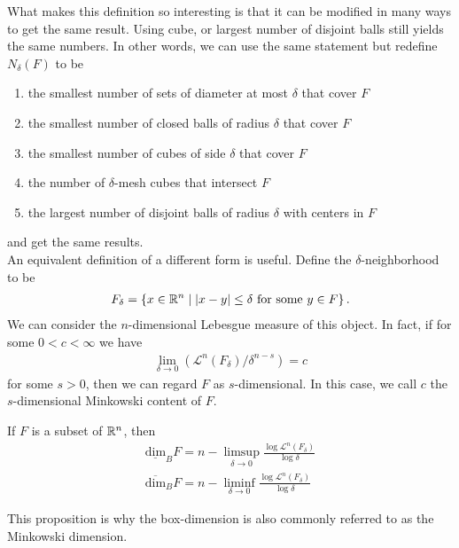 \documentclass{memoir}
\begin{document}
What makes this definition so interesting is that it can be modified in many ways to get the same result. Using cube, or largest number of disjoint balls still yields the same numbers. In other words, we can use the same statement but redefine \(N_\delta(F)\) to be
\begin{enumerate}
	\item the smallest number of sets of diameter at most \(\delta\) that cover \(F \)
	\item the smallest number of closed balls of radius \(\delta\) that cover \(F\) 
	\item the smallest number of cubes of side \(\delta\) that cover \(F\) 
	\item the number of \(\delta\)-mesh cubes that intersect \(F\) 
	\item the largest number of disjoint balls of radius \(\delta\) with centers in \(F\)
\end{enumerate}
and get the same results.\\


An equivalent definition of a different form is useful. Define the \(\delta\)-neighborhood to be
\begin{align*}
	F_\delta = \left\{x \in \mathbb{R}^{n} \mid \left| x-y \right| \leq \delta \text{ for some \(y \in F\)}\right\} .
\end{align*}
We can consider the \(n\)-dimensional Lebesgue measure of this object. In fact, if for some \(0<c<\infty\) we have
\begin{align*}
	\lim_{\delta \to 0} \left( \mathcal{L}^{n}(F_\delta) / \delta^{n-s} \right) = c
\end{align*}
for some \(s>0\), then we can regard \(F\) as \(s\)-dimensional. In this case, we call \(c\) the \(s\)-dimensional Minkowski content of \(F\).

\begin{prop}
	If \(F\) is a subset of \(\mathbb{R}^{n}\), then
	\begin{align*}
		\underline{ \textrm{dim}}_B F = n - \limsup_{\delta \to 0} \frac{\log \mathcal{L}^{n}(F_\delta)}{\log \delta}\\
		\overline{ \textrm{dim}}_B F = n - \liminf_{\delta\to 0} \frac{\log \mathcal{L}^{n}(F_\delta)}{\log \delta}
	\end{align*}
\end{prop}
This proposition is why the box-dimension is also commonly referred to as the Minkowski dimension.\\
\end{document}
